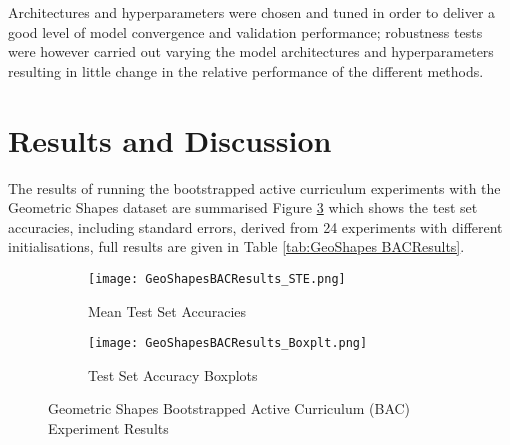Architectures and hyperparameters were chosen and tuned in order to deliver a good level of model convergence and validation performance; robustness tests were however carried out varying the model architectures and hyperparameters resulting in little change in the relative performance of the different methods. 
\section{Results and Discussion}\label{sec:BAC_Results}
The results of running the bootstrapped active curriculum experiments with the Geometric Shapes dataset are summarised Figure \ref{fig:GeoShapesBACResults} which shows the test set accuracies, including standard errors, derived from 24 experiments with different initialisations, full results are given in Table \ref{tab:GeoShapes BACResults}.

\begin{figure}[h]
\hspace*{-3cm}    
\centering
\begin{subfigure}{0.7\textwidth}
  \centering
  \texttt{[image: GeoShapesBACResults\_STE.png]}
  \caption{ Mean Test Set Accuracies}
  \label{fig:BAC_StE}
\end{subfigure}%
\begin{subfigure}{0.7\textwidth}
\hspace*{-1cm}   
  \centering
  \texttt{[image: GeoShapesBACResults\_Boxplt.png]}
  \caption{Test Set Accuracy Boxplots}
  \label{fig:BAC_Boxplt}
\end{subfigure}
\caption{Geometric Shapes Bootstrapped Active Curriculum (BAC) Experiment Results}
\label{fig:GeoShapesBACResults}
\end{figure}

